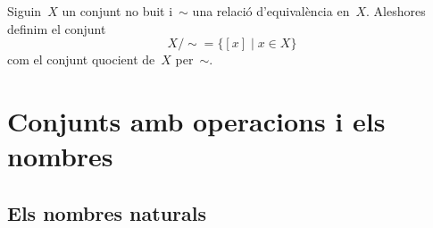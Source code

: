 \documentclass[../../main.tex]{subfiles}
\begin{document}
    \begin{definition}
        \label{def:conjunt-quocient}
        Siguin~\(X\) un conjunt no buit i~\(\sim\) una relació d'equivalència en~\(X\).
        Aleshores definim el conjunt
        \[
            X/\sim=\{[x]\mid x\in X\}
        \]
        com el conjunt quocient de~\(X\) per~\(\sim\).
    \end{definition}
\chapter{Conjunts amb operacions i els nombres}
\section{Els nombres naturals}
\end{document}
